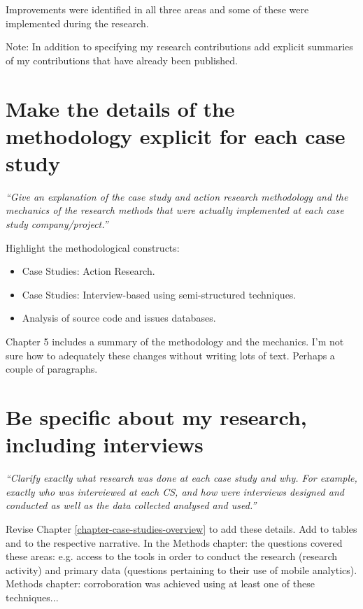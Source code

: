 Improvements were identified in all three areas and some of these were implemented during the research. 

Note: In addition to specifying my research contributions add explicit summaries of my contributions that have already been published.


\section{Make the details of the methodology explicit for each case study}
\emph{``Give an explanation of the case study and action research methodology and the mechanics of the research methods that were actually implemented at each case study company/project.''}

Highlight the methodological constructs:
\begin{itemize}
    \item Case Studies: Action Research.
    \item Case Studies: Interview-based using semi-structured techniques.
    \item Analysis of source code and issues databases.
\end{itemize}

Chapter 5 includes a summary of the methodology and the mechanics. I'm not sure how to adequately these changes without writing lots of text. Perhaps a couple of paragraphs.

\section{Be specific about my research, including interviews}
\emph{``Clarify exactly what research was done at each case study and why. For example, exactly who was interviewed at each CS, and how were interviews designed and conducted as well as the data collected analysed and used.''}

Revise Chapter \ref{chapter-case-studies-overview} to add these details. Add to tables and to the respective narrative. In the Methods chapter: the questions covered these areas: e.g. access to the tools in order to conduct the research (research activity) and primary data (questions pertaining to their use  of mobile analytics). Methods chapter: corroboration was achieved using at least one of these techniques...

